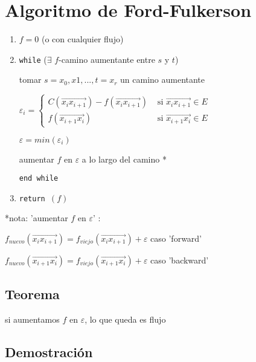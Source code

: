 \documentclass[12pt]{article}
\begin{document}
\section*{Algoritmo de Ford-Fulkerson}
\begin{enumerate}
\item \(f = 0\) (o con cualquier flujo)
\item \texttt{while} ($\exists$ $f$-camino aumentante entre $s$ y $t$)

\hspace{3em} tomar $s = x_0, x1, ..., t = x_r$ un camino aumentante

\hspace{3em} 
\(\varepsilon_i =
\begin{cases}
C(\overrightarrow{x_{i}x_{i+1}}) - f(\overrightarrow{x_{i}x_{i+1}}) & \text{ si } \overrightarrow{x_{i}x_{i+1}} \in E \\
f(\overrightarrow{x_{i+1}x_i}) & \text{ si } \overrightarrow{x_{i+1}x_i} \in E
\end{cases} 
\)

\hspace{3em} \(\varepsilon = min(\varepsilon_i)\)

\hspace{3em} aumentar $f$ en $\varepsilon$ a lo largo del camino *

\texttt{end while}

\item \texttt{return \((f)\)}
\end{enumerate}

*nota: 'aumentar $f$ en $\varepsilon$' : 

$f_{nuevo}(\overrightarrow{x_ix_{i+1}}) = f_{viejo}(\overrightarrow{x_ix_{i+1}}) + \varepsilon$ caso 'forward'

$f_{nuevo}(\overrightarrow{x_{i+1}x_{i}}) = f_{viejo}(\overrightarrow{x_{i+1}x_{i}}) + \varepsilon$ caso 'backward'

\begin{center}
\section*{Teorema}
si aumentamos $f$ en $\varepsilon$, lo que queda es flujo
\end{center}

\subsection*{Demostración}
\end{document}
